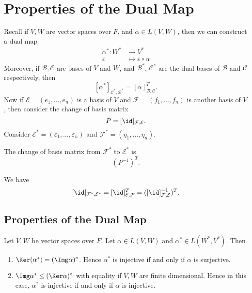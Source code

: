 \documentclass[12pt]{article}
\begin{document}
\newpage

\section{Properties of the Dual Map}%
\label{sec:properties_of_the_dual_map}

Recall if $V, W$ are vector spaces over $F$, and $\alpha \in L(V, W)$, then we can construct a dual map
\begin{align*}
	\alpha^{\ast} : W^{\ast} &\to V^{\ast} \\
	\varepsilon &\mapsto \varepsilon \circ \alpha
\end{align*}
Moreover, if $\mathcal{B}, \mathcal{C}$ are bases of $V$ and $W$, and $\mathcal{B}^{\ast}$, $\mathcal{C}^{\ast}$ are the dual bases of $\mathcal{B}$ and $\mathcal{C}$ respectively, then
\[
	[\alpha^{\ast}]_{\mathcal{C}^{\ast}, \mathcal{B}^{\ast}} = [\alpha]_{\mathcal{B}, \mathcal{C}}^{T}
.\]
Now if $\mathcal{E} = (e_1, \ldots, e_n)$ is a basis of $V$ and $\mathcal{F} = (f_1, \ldots, f_n)$ is another basis of $V$, then consider the change of basis matrix
\[
	P = [\id]_{\mathcal{F}, \mathcal{E}}
.\]
Consider $\mathcal{E}^{\ast} = (\varepsilon_1, \ldots, \varepsilon_n)$ and $\mathcal{F}^{\ast} = (\eta_1, \ldots, \eta_n)$.

\begin{lemma}
	The change of basis matrix from $\mathcal{F}^{\ast}$ to $\mathcal{E}^{\ast}$ is
	\[
		(P^{-1})^{T}
	.\]
\end{lemma}
\begin{proofbox}
	We have
\[
	[\id]_{\mathcal{F}^{\ast}, \mathcal{E}^{\ast}} = [\id]_{\mathcal{E}, \mathcal{F}}^{T} = ([\id]_{\mathcal{F}, \mathcal{E}}^{-1})^{T}
.\]
\end{proofbox}

\subsection{Properties of the Dual Map}%
\label{sub:properties_of_the_dual_map}

\begin{lemma}
	Let $V, W $ be vector spaces over $F$. Let $\alpha \in L(V, W)$ and $\alpha^{\ast} \in L(W^{\ast}, V^{\ast})$. Then
	\begin{enumerate}[\normalfont(i)]
		\item $\Ker(\alpha^{\ast}) = (\Img \alpha)^{\circ}$. Hence $\alpha^{\ast}$ is injective if and only if $\alpha$ is surjective.
		\item $\Img \alpha^{\ast} \leq (\Ker \alpha)^{\circ}$ with equality if $V, W$ are finite dimensional. Hence in this case, $\alpha^{\ast}$ is injective if and only if $\alpha$ is injective.
	\end{enumerate}
\end{lemma}
\end{document}
